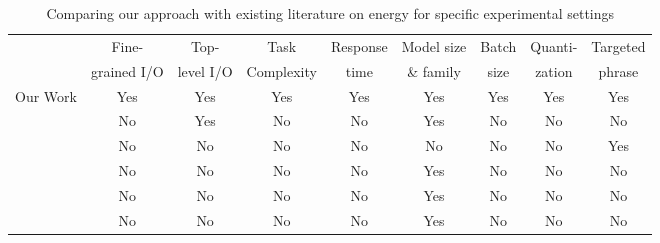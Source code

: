\begin{table*}[ht]
    \centering
    \footnotesize
    \begin{tabular}{p{26mm}|c|c|c|c|c|c|c|c}
    \toprule
    & Fine- & Top- & Task & Response  & Model size & Batch  & Quanti- & Targeted  \\
    & grained  I/O & level  I/O & Complexity & time & \& family  &  size & zation & phrase \\
    
    \midrule
 Our Work                     & Yes & Yes & Yes & Yes & Yes & Yes & Yes & Yes \\
\citet{luccioni2024power}      & No  & Yes & No & No  & Yes & No & No & No \\
\citet{li2024toward}           & No  & No & No & No  & No & No & No & Yes \\
\citet{everman2023evaluating}  & No  & No & No & No  & Yes & No & No & No \\
\citet{desislavov2021compute}  & No  & No & No & No  & Yes & No & No & No \\
\citet{samsi2023words}         & No  & No & No & No  & Yes & No & No & No \\

    \bottomrule
    \end{tabular}
    \caption{Comparing our approach with existing literature on energy for specific experimental settings}
    \label{tab:comparison}
\end{table*}

%


